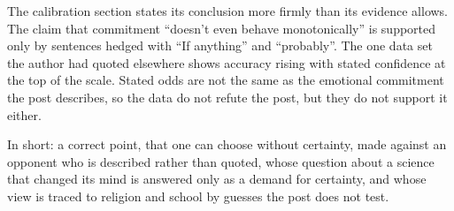 \begin{afterword}
The calibration section states its conclusion more firmly than its evidence allows. The claim that commitment ``doesn't even behave monotonically'' is supported only by sentences hedged with ``If anything'' and ``probably''. The one data set the author had quoted elsewhere shows accuracy rising with stated confidence at the top of the scale. Stated odds are not the same as the emotional commitment the post describes, so the data do not refute the post, but they do not support it either.

In short: a correct point, that one can choose without certainty, made against an opponent who is described rather than quoted, whose question about a science that changed its mind is answered only as a demand for certainty, and whose view is traced to religion and school by guesses the post does not test.
\end{afterword}

